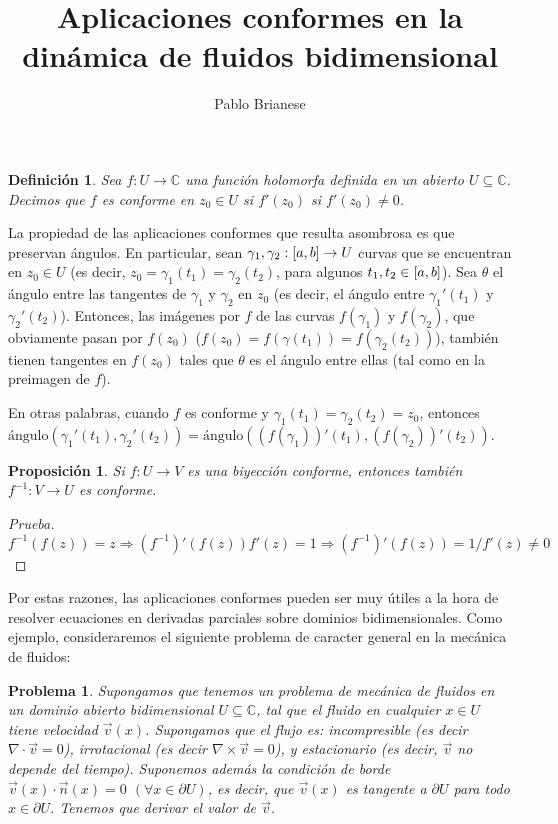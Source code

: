 \documentclass{article}
\title{Aplicaciones conformes en la dinámica de fluidos bidimensional}
\author{Pablo Brianese}
\newcommand{\complexNumbers}{\mathbb{C}}
\newcommand{\leftOpenInterval}{\left]}
\newcommand{\rightOpenInterval}{\right[}
\newcommand{\leftClosedInterval}{\left[}
\newcommand{\rightClosedInterval}{\right]}
\newcommand{\interval}[3]{%
  \ifstrequal{#1}{oo}{%
    \leftOpenInterval #2, #3 \rightOpenInterval%
  }{%
    \ifstrequal{#1}{co}{%
      \leftClosedInterval #2, #3 \rightOpenInterval%
    }{%
      \ifstrequal{#1}{oc}{
        \leftOpenInterval #2, #3 \rightClosedInterval%
      }{%
        \ifstrequal{#1}{cc}{
          \leftClosedInterval #2, #3 \rightClosedInterval
        }{%
        }%
      }%
    }%
  }%
}
\newtheorem{proposition}{Proposición}
\newtheorem{problem}{Problema}
\newtheorem{definition}{Definición}
\theoremstyle{remark}
\begin{document}
  \maketitle
  \begin{definition}
    Sea \(f : U \rightarrow \complexNumbers\) una función holomorfa definida en un abierto \(U \subseteq \complexNumbers\).
    Decimos que \(f\) es conforme en \(z_0 \in U\) si \(f'(z_0)\) si \(f'(z_0) \neq 0\).
  \end{definition}

  La propiedad de las aplicaciones conformes que resulta asombrosa es que preservan ángulos.
  En particular, sean \(\gamma_1, \gamma_2 : \interval{cc}{a}{b} \rightarrow U\) curvas que se encuentran en \(z_0 \in U\) (es decir, \(z_0 = \gamma_1(t_1) = \gamma_2(t_2)\), para algunos \(t_1, t_2 \in \interval{cc}{a}{b}\)).
  Sea \(\theta\) el ángulo entre las tangentes de \(\gamma_1\) y \(\gamma_2\) en \(z_0\) (es decir, el ángulo entre \(\gamma_1'(t_1)\) y \(\gamma_2'(t_2)\)).
  Entonces, las imágenes por \(f\) de las curvas \(f(\gamma_1)\) y \(f(\gamma_2)\), que obviamente pasan por \(f(z_0)\) (\(f(z_0) = f(\gamma(t_1)) = f(\gamma_2(t_2))\)), también tienen tangentes en \(f(z_0)\) tales que \(\theta\) es el ángulo entre ellas (tal como en la preimagen de \(f\)).
  
  En otras palabras, cuando \(f\) es conforme y \(\gamma_1(t_1) = \gamma_2(t_2) = z_0\), entonces \(\text{ángulo}(\gamma_1'(t_1), \gamma_2'(t_2)) = \text{ángulo}((f(\gamma_1))'(t_1), (f(\gamma_2))'(t_2))\).

  \begin{proposition}
    Si \(f: U \rightarrow V\) es una biyección conforme, entonces también \(f^{-1} : V \rightarrow U\) es conforme.
  \end{proposition}
  \begin{proof}[Prueba]
    \({f^{-1} (f (z)) = z} \Rightarrow {(f^{- 1})'(f(z)) f'(z) = 1} \Rightarrow {(f^{-1})'(f(z)) = 1 / f'(z) \neq 0}\)
  \end{proof}

  Por estas razones, las aplicaciones conformes pueden ser muy útiles a la hora de resolver ecuaciones en derivadas parciales sobre dominios bidimensionales.
  Como ejemplo, consideraremos el siguiente problema de caracter general en la mecánica de fluidos:

  \begin{problem}
    Supongamos que tenemos un problema de mecánica de fluidos en un dominio abierto bidimensional \(U \subseteq \complexNumbers\), tal que el fluido en cualquier \(x \in U\) tiene velocidad \(\vec{v}(x)\).
    Supongamos que el flujo es:
    incompresible (es decir \(\nabla \cdot \vec{v} = 0\)), irrotacional (es decir \(\nabla \times \vec{v} = 0\)), y estacionario (es decir, \(\vec{v}\) no depende del tiempo).
    Suponemos además la condición de borde \(\vec{v}(x) \cdot \vec{n}(x) = 0\) \((\forall x \in \partial U)\), es decir, que \(\vec{v}(x)\) es tangente a \(\partial U\) para todo \(x \in \partial U\).
    Tenemos que derivar el valor de \(\vec{v}\).
  \end{problem}
\end{document}
